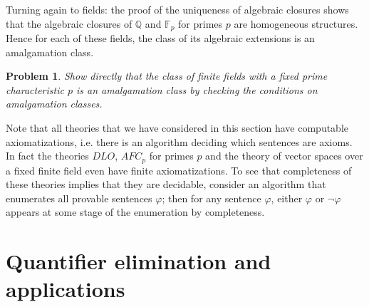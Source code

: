 \documentclass[10pt]{amsart}
\newcommand{\FF}{\mathbb{F}}
\newcommand{\QQ}{\mathbb{Q}}
\newtheorem{problem}[theorem]{Problem}
\theoremstyle{definition}
\theoremstyle{remark}
\begin{document}
Turning again to fields: the proof of the uniqueness of algebraic closures shows that the algebraic closures of $\QQ$ and $\FF_p$ for primes $p$ are homogeneous structures. Hence for each of these fields, the class of its algebraic extensions is an amalgamation class. 

\begin{problem} 
Show directly that the class of finite fields with a fixed prime characteristic $p$ is an amalgamation class by checking the conditions on amalgamation classes. 
\end{problem} 
\iffalse 
\begin{proof} 
It is clear that the class is hereditary. Let $K$ denote a fixed algebraic closure of $\FF_p$ and assume that $\FF_{p^n}$ is a subset of $K$ for all $n\geq 1$. Since every finite field with characteristic $p$ is isomorphic to $\FF_{p^n}$ for some $n\geq 1$ and hence embeds into $K$, the joint embedding property holds. 

To prove amalgamation, we first show that $\FF_{p^m}\subseteq \FF_{p^n}$ if and only if $m|n$ for all $m,n\geq 1$. If $\FF_{p^m}$ is a subfield of $\FF_{p^n}$, then $\FF_{p^n}$ is an $\FF_{p^m}$-vector space of some dimension $d\geq1$. Hence $p^n=(p^m)^d=p^{md}$. Now assume conversely that $n=md$ for some $d\geq1$. Recall that $x\in \FF_{p^l}\Longleftrightarrow x^{p^l}=x$. If $x^{p^m}=x$, then $x^{p^n}=x^{p^{md}}=x^{(p^m)^d}=((x^{p^m}){}^{p^m \dots})^{p^m}=x$. Thus $\FF_{p^m}$ is a subfield of $\FF_{p^n}$. 

SHOW AMALGAMATION 
\end{proof} 
\fi 


Note that all theories that we have considered in this section have computable axiomatizations, i.e. there is an algorithm deciding which sentences are axioms. In fact the theories $DLO$, $AFC_p$ for primes $p$ and the theory of vector spaces over a fixed finite field even have finite axiomatizations. To see that completeness of these theories implies that they are decidable, consider an algorithm that enumerates all provable sentences $\varphi$; then for any sentence $\varphi$, either $\varphi$ or $\neg\varphi$ appears at some stage of the enumeration by completeness. 



 
\section{Quantifier elimination and applications} 
\end{document}
